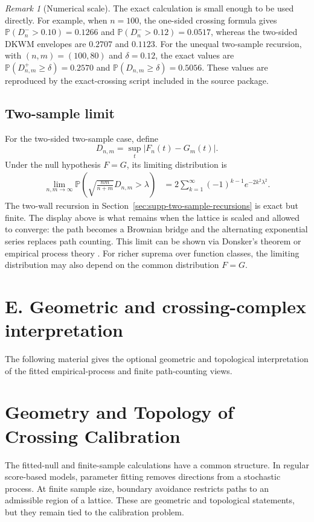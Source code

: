\documentclass[12pt]{article}
\theoremstyle{remark}
\newtheorem{remark}[theorem]{Remark}
\begin{document}
\begin{remark}[Numerical scale]
The exact calculation is small enough to be used directly. For example, when
$n=100$, the one-sided crossing formula gives
$\mathbb{P}(D_n^->0.10)=0.1266$ and
$\mathbb{P}(D_n^->0.12)=0.0517$, whereas the two-sided DKWM envelopes are
$0.2707$ and $0.1123$. For the unequal two-sample recursion, with
$(n,m)=(100,80)$ and $\delta=0.12$, the exact values are
$\mathbb{P}(D_{n,m}^{+}\ge\delta)=0.2570$ and
$\mathbb{P}(D_{n,m}\ge\delta)=0.5056$. These values are reproduced by the
exact-crossing script included in the source package.
\end{remark}

\subsection*{Two-sample limit}
For the two-sided two-sample case, define
\[
D_{n,m}=\sup_t|F_n(t)-G_m(t)|.
\]
Under the null hypothesis $F=G$, its limiting distribution is
\begin{align}
    \lim_{n,m\rightarrow\infty}\mathbb{P}\left( \sqrt{\frac{nm}{n+m}}D_{n,m}> \lambda \right)&=2\sum_{k=1}^\infty (-1)^{k-1}e^{-2k^2\lambda^2}.
\end{align}
The two-wall recursion in Section~\ref{sec:supp-two-sample-recursions} is
exact but finite. The display above is what remains when the lattice is scaled
and allowed to converge: the path becomes a Brownian bridge and the alternating
exponential series replaces path counting.
This limit can be shown via Donsker's theorem or empirical process theory
\cite{kosorok2008introduction}. For richer suprema over function classes, the
limiting distribution may also depend on the common distribution $F=G$.

\section*{E. Geometric and crossing-complex interpretation}

The following material gives the optional geometric and topological interpretation of the fitted empirical-process and finite path-counting views.

\section{Geometry and Topology of Crossing Calibration}
\label{sec:geometry-topology}

The fitted-null and finite-sample calculations have a common structure.
In regular score-based models, parameter fitting removes directions from a
stochastic process.
At finite sample size, boundary avoidance restricts paths to an admissible
region of a lattice. These are geometric and topological statements, but they
remain tied to the calibration problem.
\end{document}
